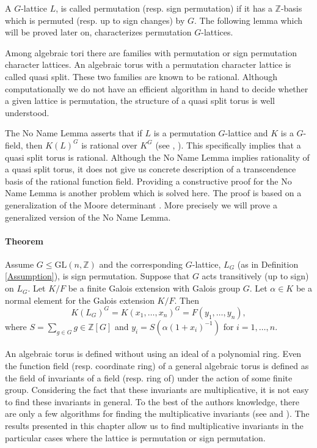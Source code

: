 \documentclass[12pt]{article}
\theoremstyle{plain}
\newcommand{\Z}{\ensuremath{\mathbb{Z}}}
\begin{document}
A $G$-lattice $L$, is called permutation (resp. sign permutation) if it has a $\Z$-basis which is permuted (resp. up to sign changes) by $G$. The following lemma which will be proved later on, characterizes permutation $G$-lattices. 


Among algebraic tori there are families with permutation or sign
permutation character lattices. An algebraic torus with a permutation
character lattice is called quasi split. These two families are known
to be rational. Although computationally we do not have an efficient
algorithm in hand to decide whether a given lattice is permutation,
the structure of a quasi split torus is well understood.

The No Name Lemma asserts that if $L$ is a permutation $G$-lattice and
$K$ is a $G$-field, then $K(L)^G$ is rational over $K^G$ (see
\cite{Lenstra}, \cite{Domokos}). This specifically implies that a
quasi split torus is rational. Although the No Name Lemma implies
rationality of a quasi split torus, it does not give us concrete
description of a transcendence basis of the rational function
field. Providing a constructive proof for the No Name Lemma is another
problem which is solved here. The proof is based on a generalization
of the Moore determinant \cite[Section 1.3]{Goss}. More precisely we
will prove a generalized version of the No Name Lemma.

\paragraph{Theorem}
Assume $G \leq \mathrm{GL}(n,\Z)$ and the corresponding $G$-lattice, $L_G$ (as in Definition \ref{Assumption}), is sign permutation. Suppose that $G$ acts transitively (up to sign) on $L_G$. Let $K/F$ be a finite Galois extension with Galois group $G$. Let $\alpha \in K$ be a normal element for the Galois extension $K/F$. Then 
$$K(L_G)^G = K(x_1,\ldots, x_n)^G = F(y_1, \ldots, y_{n}),$$ 
where $S = \sum_{g \in G} g \in \Z[G]$ and $y_i = S(\alpha (1+x_i)^{-1})$ for $ i = 1, \ldots, n$.
\\
\\
An algebraic torus is defined without using an ideal of a polynomial ring. Even the function field (resp. coordinate ring) of a general algebraic torus is defined as the field of invariants of a field (resp. ring of) under the action of some finite group. Considering the fact that these invariants are multiplicative, it is not easy to find these invariants in general. To the best of the authors knowledge, there are only a few algorithms for finding the multiplicative invariants (see \cite{Kemper} and \cite{Lorenz}). The results presented in this chapter allow us to find multiplicative invariants in the particular cases where the lattice is permutation or sign permutation.\\
\end{document}

